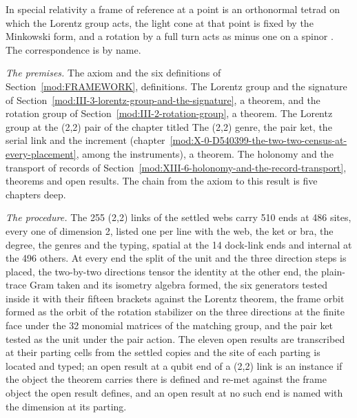 \begin{chbridge}
In special relativity a frame of reference at a point is an orthonormal tetrad on which the Lorentz group acts, the light cone at that point is fixed by the Minkowski form, and a rotation by a full turn acts as minus one on a spinor \cite{Minkowski1908,Wigner1939,Wald1984}. The correspondence is by name.
\end{chbridge}
\begin{chproof}
\textit{The premises.} The axiom and the six definitions of Section~\ref{mod:FRAMEWORK}, definitions. The Lorentz group and the signature of Section~\ref{mod:III-3-lorentz-group-and-the-signature}, a theorem, and the rotation group of Section~\ref{mod:III-2-rotation-group}, a theorem. The Lorentz group at the (2,2) pair of the chapter titled The (2,2) genre, the pair ket, the serial link and the increment (chapter~\ref{mod:X-0-D540399-the-two-two-census-at-every-placement}, among the instruments), a theorem. The holonomy and the transport of records of Section~\ref{mod:XIII-6-holonomy-and-the-record-transport}, theorems and open results. The chain from the axiom to this result is five chapters deep.

\textit{The procedure.} The 255 (2,2) links of the settled webs carry 510 ends at 486 sites, every one of dimension 2, listed one per line with the web, the ket or bra, the degree, the genres and the typing, spatial at the 14 dock-link ends and internal at the 496 others. At every end the split of the unit and the three direction steps is placed, the two-by-two directions tensor the identity at the other end, the plain-trace Gram taken and its isometry algebra formed, the six generators tested inside it with their fifteen brackets against the Lorentz theorem, the frame orbit formed as the orbit of the rotation stabilizer on the three directions at the finite face under the 32 monomial matrices of the matching group, and the pair ket tested as the unit under the pair action. The eleven open results are transcribed at their parting cells from the settled copies and the site of each parting is located and typed; an open result at a qubit end of a (2,2) link is an instance if the object the theorem carries there is defined and re-met against the frame object the open result defines, and an open result at no such end is named with the dimension at its parting.


\end{chproof}

